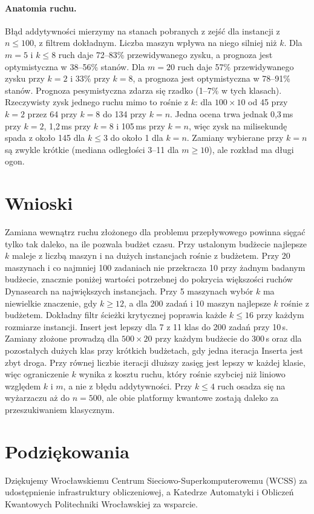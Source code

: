 \documentclass[letterpaper]{article} %
\theoremstyle{definition}
\newif\ifanon
\begin{document}
\paragraph{Anatomia ruchu.}
Błąd addytywności mierzymy na stanach
pobranych z zejść dla instancji z $n\leq 100$, z filtrem dokładnym.
Liczba maszyn wpływa na niego silniej niż $k$. Dla $m=5$ i $k\leq 8$ ruch
daje 72--83\% przewidywanego zysku, a prognoza jest optymistyczna
w 38--56\% stanów. Dla $m=20$ ruch daje 57\% przewidywanego zysku przy
$k=2$ i 33\% przy $k=8$, a prognoza jest optymistyczna w 78--91\% stanów.
Prognoza pesymistyczna zdarza się rzadko (1--7\% w tych klasach). Rzeczywisty zysk
jednego ruchu mimo to rośnie z $k$: dla $100\times 10$ od 45 przy $k=2$
przez 64 przy $k=8$ do 134 przy $k=n$. Jedna ocena trwa jednak 0,3\,ms
przy $k=2$, 1,2\,ms przy $k=8$ i 105\,ms przy $k=n$, więc zysk na
milisekundę spada z około 145 dla $k\leq 3$ do około 1 dla $k=n$. Zamiany
wybierane przy $k=n$ są zwykle krótkie (mediana odległości 3--11 dla $m\geq 10$), ale rozkład ma długi ogon.


\section{Wnioski}
Zamiana wewnątrz ruchu złożonego dla problemu przepływowego powinna sięgać
tylko tak daleko, na ile pozwala budżet czasu. Przy ustalonym budżecie
najlepsze $k$ maleje z liczbą maszyn i na dużych instancjach rośnie z budżetem. Przy 20
maszynach i co najmniej 100 zadaniach nie przekracza 10 przy żadnym
badanym budżecie, znacznie poniżej wartości potrzebnej do pokrycia
większości ruchów Dynasearch na największych instancjach. Przy 5
maszynach wybór $k$ ma niewielkie znaczenie, gdy $k\geq 12$, a dla 200
zadań i 10 maszyn najlepsze $k$ rośnie z budżetem. Dokładny filtr ścieżki
krytycznej poprawia każde $k\leq 16$ przy każdym rozmiarze instancji.
Insert jest lepszy dla 7 z 11 klas do 200 zadań przy 10\,s. Zamiany
złożone prowadzą dla $500\times 20$ przy każdym budżecie do 300\,s oraz dla pozostałych dużych
klas przy krótkich budżetach, gdy jedna iteracja Inserta jest zbyt droga. Przy równej liczbie iteracji dłuższy zasięg jest lepszy w każdej klasie, więc ograniczenie $k$ wynika z kosztu ruchu, który rośnie szybciej niż liniowo względem $k$ i $m$, a nie z błędu addytywności. Przy $k\leq 4$ ruch osadza się na wyżarzaczu aż do
$n=500$, ale obie platformy kwantowe zostają daleko za przeszukiwaniem klasycznym.

\ifanon\else
\section*{Podziękowania}
Dziękujemy Wrocławskiemu Centrum Sieciowo-Superkomputerowemu (WCSS)
za udostępnienie infrastruktury obliczeniowej, a Katedrze Automatyki
i Obliczeń Kwantowych Politechniki Wrocławskiej za wsparcie.
\fi


\end{document}
